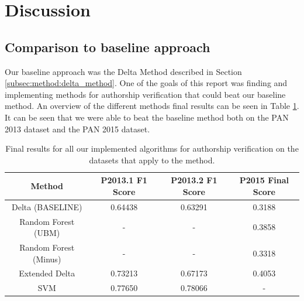\section{Discussion} \label{sec:discussion}

\subsection{Comparison to baseline approach}
Our baseline approach was the Delta Method described in Section
\ref{subsec:method:delta_method}. One of the goals of this report was finding
and implementing methods for authorship verification that could beat our
baseline method. An overview of the different methods final results can be seen
in Table \ref{tab:all_final_results}. It can be seen that we were able to beat
the baseline method both on the PAN 2013 dataset and the PAN 2015 dataset.


\begin{table}
    \centering
    \begin{tabular}{|c|c|c|c|}
    \hline
    \textbf{Method}             & \textbf{P2013.1 F1 Score} & \textbf{P2013.2 F1 Score} & \textbf{P2015 Final Score} \\ \hline
    Delta (BASELINE)            & 0.64438                      & 0.63291                      & 0.3188                        \\ \hline
    Random Forest (\gls{UBM}) & -                            & -                            & 0.3858                        \\ \hline
    Random Forest (Minus)       & -                            & -                            & 0.3318                        \\ \hline
    Extended Delta              & 0.73213                      & 0.67173                      & 0.4053                        \\ \hline
    SVM                         & 0.77650                      & 0.78066                      & -                             \\ \hline
    \end{tabular}
    \caption{Final results for all our implemented algorithms for authorship
    verification on the datasets that apply to the method.}
    \label{tab:all_final_results}
\end{table}

